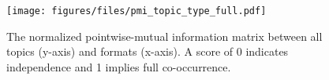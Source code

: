 \begin{figure}[!ht]
    \centering
    \texttt{[image: figures/files/pmi\_topic\_type\_full.pdf]}
    \caption{The normalized pointwise-mutual information matrix between all topics (y-axis) and formats (x-axis). A score of 0 indicates independence and 1 implies full co-occurrence.}
    \label{fig:pmi_topic_type_full}
\end{figure}
